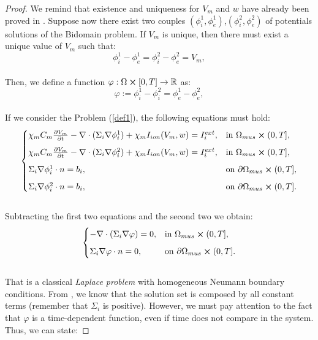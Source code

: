 \documentclass[a4paper,11pt]{article}
\begin{document}
\begin{proof}
	\vspace{2mm} We remind that existence and uniqueness for $V_m$ and $w$ have already been proved in \cite{bourgault}. 
	Suppose now there exist two couples $(\phi_i^1,\phi_e^1)$,$(\phi_i^2,\phi_e^2)$ of potentials solutions of the Bidomain problem. If $V_m$ is unique, then there must exist a unique value of $V_m$ such that:
	\begin{equation*}
	\phi_i^1-\phi_e^1 = \phi_i^2-\phi_e^2 = V_m,
	\end{equation*}\\
	Then, we define a function $\varphi:\Omega \cross [0,T] \rightarrow \mathbb{R}$ as:
	\begin{equation*}
	\varphi := \phi_i^1-\phi_i^2 = \phi_e^1-\phi_e^2,
	\end{equation*}\\
	If we consider the Problem (\ref{def1}), the following equations must hold:
	\begin{equation*}
	\begin{cases}
	\chi_m C_m\pdv{V_m}{t} - \nabla \cdot (\Sigma_i \nabla \phi_i^1) + \chi_m I_{ion}(V_m,w) = I_i^{ext},    & \text{in } \Omega_{mus} \cross (0,T],\vspace{2mm}
	\\
	\chi_m C_m\pdv{V_m}{t} - \nabla \cdot (\Sigma_i \nabla \phi_i^2) + \chi_m I_{ion}(V_m,w) = I_i^{ext},    & \text{in } \Omega_{mus} \cross (0,T],\vspace{2mm}
	\\
	\Sigma_i\nabla \phi_i^1 \cdot n = b_i,   & \text{on } \partial \Omega_{mus} \cross (0,T],\vspace{2mm}
	\\
	\Sigma_i\nabla \phi_i^2 \cdot n = b_i,   & \text{on } \partial \Omega_{mus} \cross (0,T].
	\end{cases}
	\end{equation*}\\
	Subtracting the first two equations and the second two we obtain:
	\begin{equation*}
	\begin{cases}
	- \nabla \cdot (\Sigma_i \nabla \varphi) = 0,    & \text{in } \Omega_{mus} \cross (0,T],\vspace{2mm}
	\\
	\Sigma_i\nabla \varphi \cdot n = 0,   & \text{on } \partial \Omega_{mus} \cross (0,T].
	\end{cases}
	\end{equation*} \\
	That is a classical \emph{Laplace problem} with homogeneous Neumann boundary conditions. From \cite{salsa}, we know that the solution set is composed by all constant terms (remember that $\Sigma_i$ is positive). However, we must pay attention to the fact that $\varphi$ is a time-dependent function, even if time does not compare in the system. Thus, we can state:
	

\end{proof}
\end{document}
